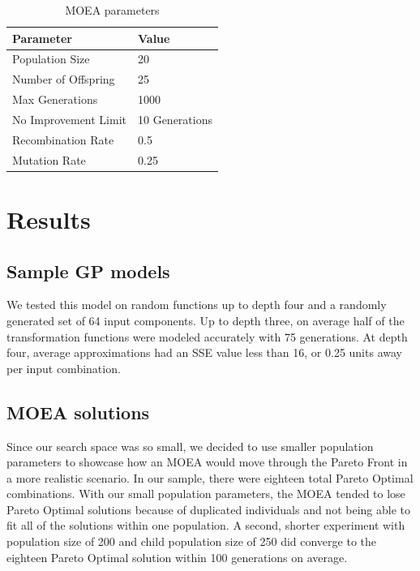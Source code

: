 \documentclass{IEEEtran}
\begin{document}
\begin{table}[!h]
\centering
\caption{MOEA parameters}
\begin{tabular}{l|l}
\toprule[1.5pt]
Parameter & Value \\\midrule[1pt]
Population Size & 20 \\ 
Number of Offspring & 25 \\
Max Generations & 1000 \\
No Improvement Limit & 10 Generations \\
Recombination Rate & 0.5 \\
Mutation Rate & 0.25 \\
\bottomrule[1.25pt]
\end{tabular}
\end{table}

\section{Results}
\subsection{Sample GP models}
We tested this model on random functions up to depth four and a randomly generated set of 64 input components. Up to depth three, on average half of the transformation functions were modeled accurately with 75 generations. At depth four, average approximations had an SSE value less than 16, or 0.25 units away per input combination.

\subsection{MOEA solutions}
Since our search space was so small, we decided to use smaller population parameters to showcase how an MOEA would move through the Pareto Front in a more realistic scenario. In our sample, there were eighteen total Pareto Optimal combinations. With our small population parameters, the MOEA tended to lose Pareto Optimal solutions because of duplicated individuals and not being able to fit all of the solutions within one population. A second, shorter experiment with population size of 200 and child population size of 250 did converge to the eighteen Pareto Optimal solution within 100 generations on average.
\end{document}
